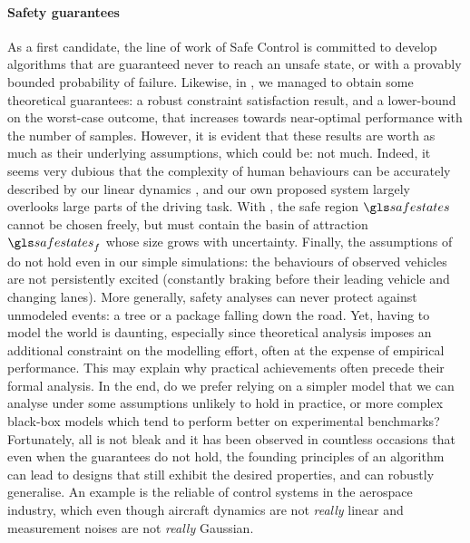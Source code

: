 \paragraph{Safety guarantees}

As a first candidate, the line of work of Safe Control is committed to develop algorithms that are guaranteed never to reach an unsafe state, or with a provably bounded probability of failure. 
Likewise, in , we managed to obtain some theoretical guarantees: a robust constraint satisfaction result, and a lower-bound on the worst-case outcome, that increases towards near-optimal performance with the number of samples. However, it is evident that these results are worth as much as their underlying assumptions, which could be: not much. Indeed, it seems very dubious that the complexity of human behaviours can be accurately described by our linear dynamics , and our own proposed system largely overlooks large parts of the driving task. With , the safe region $\safestates$ cannot be chosen freely, but must contain the basin of attraction $\safestates_{f}$ whose size grows with uncertainty. Finally, the assumptions of  do not hold even in our simple simulations: the behaviours of observed vehicles are not persistently excited (\ie constantly braking before their leading vehicle and changing lanes). More generally, safety analyses can never protect against unmodeled events: a tree or a package falling down the road. Yet, having to model the world is daunting, especially since theoretical analysis imposes an additional constraint on the modelling effort, often at the expense of empirical performance. This may explain why practical achievements often precede their formal analysis. In the end, do we prefer relying on a simpler model that we can analyse under some assumptions unlikely to hold in practice, or more complex black-box models which tend to perform better on experimental benchmarks? Fortunately, all is not bleak and it has been observed in countless occasions that even when the guarantees do not hold, the founding principles of an algorithm can lead to designs that still exhibit the desired properties, and can robustly generalise. An example is the reliable of control systems in the aerospace industry, which even though aircraft dynamics are not \emph{really} linear and measurement noises are not \emph{really} Gaussian.


